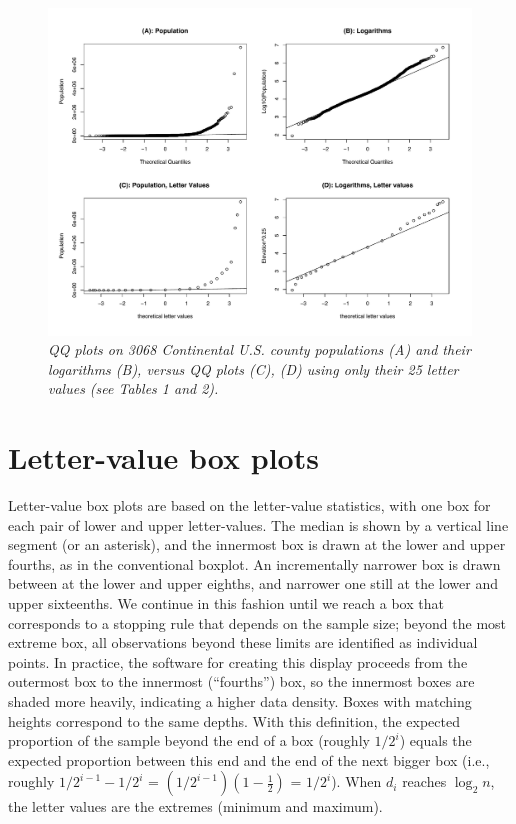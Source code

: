 \documentclass[oneside]{article}
\begin{document}
\begin{figure}[hbt]
\begin{center}
\includegraphics[scale=.5,angle=270]{qqpop4}
\caption{\it \label{qqpop4} QQ plots on 3068 Continental U.S. county
populations (A) and their logarithms (B), versus QQ plots (C), (D) 
using only their 25 letter values (see Tables 1 and 2).}
\end{center}
\end{figure}



\section{Letter-value box plots}

Letter-value box plots are based on the letter-value statistics,
with one box for each pair of lower and upper letter-values.
The median is shown by a vertical line segment (or an asterisk),
and the innermost box is drawn at the lower and upper fourths, 
as in the conventional boxplot.
An incrementally narrower box is drawn between at the lower
and upper eighths, and narrower one still at the lower
and upper sixteenths.
We continue in this fashion until we reach a box that corresponds 
to a stopping rule that depends on the sample size; beyond the 
most extreme box, all observations beyond these limits 
are identified as individual points.
In practice, the software for creating this display
proceeds from the outermost box to the innermost (``fourths'')
box, so the innermost boxes are shaded more heavily,
indicating a higher data density.
Boxes with matching heights correspond to the same depths.
With this definition, the expected proportion of the 
sample beyond the end of a box (roughly $1/2^i$)
equals the expected proportion between this end 
and the end of the next bigger box
(i.e., roughly $1/2^{i-1} - 1/2^i$ = $(1/2^{i-1})(1 - \frac{1}{2})$
= $1 / 2^i$).
When $d_i$ reaches $\log_2 n$, the letter values are the extremes
(minimum and maximum).
\end{document}
